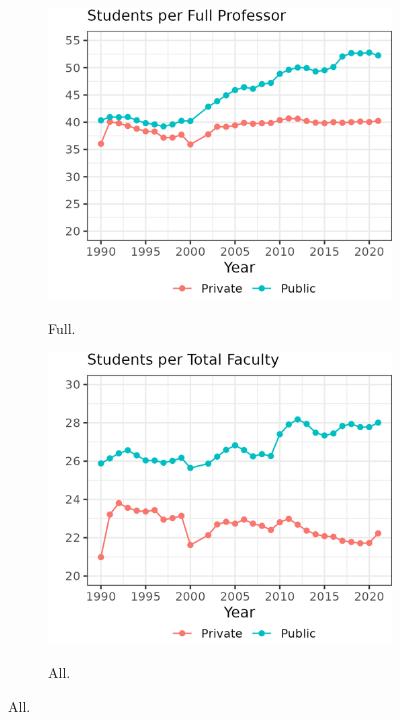 \begin{figure}[H]
\begin{subfigure}[b]{0.495\textwidth}
        \label{fig:assistant-fte-perprof}
    \end{subfigure}
    \begin{subfigure}[b]{0.495\textwidth}
        \centering
        \caption{Full.}
        \includegraphics[width=\textwidth]{figures/full-fte-perprof.png}
        \label{fig:full-fte-perprof}
    \end{subfigure}
    \begin{subfigure}[b]{0.495\textwidth}
        \centering
        \caption{All.}
        \includegraphics[width=\textwidth]{figures/all-fte-perprof.png}
        \label{fig:all-fte-perprof}
    \end{subfigure}
    \label{fig:fte-perprof}


\end{figure}
